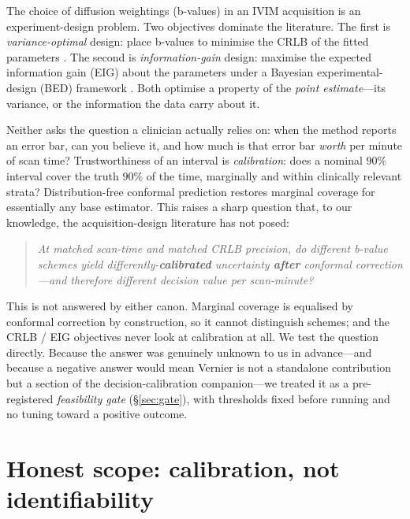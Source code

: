 \documentclass[11pt]{article}
\begin{document}
The choice of diffusion weightings (b-values) in an IVIM acquisition is an
experiment-design problem. Two objectives dominate the literature. The first is
\emph{variance-optimal} design: place b-values to minimise the CRLB of the fitted
parameters \cite{lemke2011optimal,zhang2013crlb,jalnefjord2019optimization}. The
second is \emph{information-gain} design: maximise the expected information gain (EIG)
about the parameters under a Bayesian experimental-design (BED) framework
\cite{alexander2008framework,dai2026impulsed,iollo2025activemri}. Both optimise a
property of the \emph{point estimate}---its variance, or the information the data carry
about it.

Neither asks the question a clinician actually relies on: when the method reports an
error bar, can you believe it, and how much is that error bar \emph{worth} per minute
of scan time? Trustworthiness of an interval is \emph{calibration}: does a nominal
$90\%$ interval cover the truth $90\%$ of the time, marginally and within
clinically relevant strata? Distribution-free conformal prediction
\cite{vovk2005algorithmic,lei2018distributionfree,romano2019cqr} restores marginal
coverage for essentially any base estimator. This raises a sharp question that, to our
knowledge, the acquisition-design literature has not posed:

\begin{quote}
\emph{At matched scan-time and matched CRLB precision, do different b-value schemes
yield differently-\textbf{calibrated} uncertainty \textbf{after} conformal
correction---and therefore different decision value per scan-minute?}
\end{quote}

This is not answered by either canon. Marginal coverage is equalised by conformal
correction by construction, so it cannot distinguish schemes; and the CRLB / EIG
objectives never look at calibration at all. We test the question directly. Because the
answer was genuinely unknown to us in advance---and because a negative answer would
mean Vernier is not a standalone contribution but a section of the decision-calibration
companion---we treated it as a pre-registered \emph{feasibility gate}
(\S\ref{sec:gate}), with thresholds fixed before running and no tuning toward a
positive outcome.

\section{Honest scope: calibration, not identifiability}
\label{sec:scope}
\end{document}
